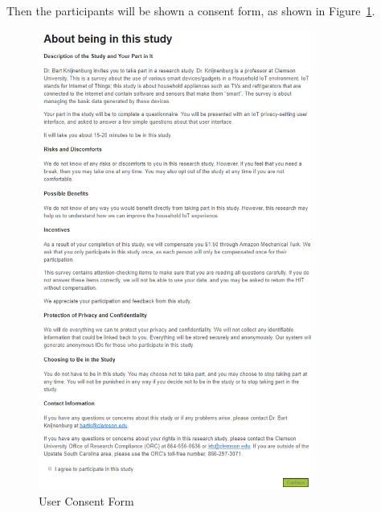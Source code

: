 Then the participants will be shown a consent form, as shown in Figure~\ref{fig:us2}.
\begin{figure}
	\centering
	\includegraphics[width=0.8\textwidth]{figures/userstudy2.png}
	\caption{User Consent Form}
	\label{fig:us2}
\end{figure}

